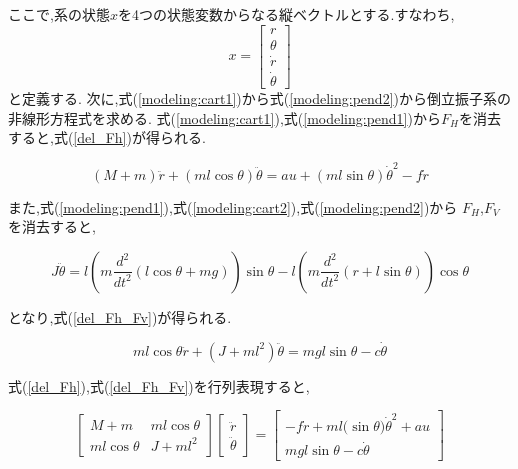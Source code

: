 ここで,系の状態$x$を4つの状態変数からなる縦ベクトルとする.すなわち,
$$
    x = \left[
    \begin{array}{c}
        r \\
        \theta \\
        \dot{r} \\
        \dot{\theta}
    \end{array}
    \right]
$$
と定義する.
次に,式(\ref{modeling:cart1})から式(\ref{modeling:pend2})から倒立振子系の非線形方程式を求める.
式(\ref{modeling:cart1}),式(\ref{modeling:pend1})から$F_{H}$を消去すると,式(\ref{del_Fh})が得られる.

\begin{equation}
    (M + m) \ddot{r} + (ml\cos{\theta}) \ddot{\theta} = au + (ml\sin{\theta}) \dot{\theta}^2 - f \dot{r}
    \label{del_Fh}
\end{equation}

また,式(\ref{modeling:pend1}),式(\ref{modeling:cart2}),式(\ref{modeling:pend2})から
$F_{H}$,$F_{V}$を消去すると,

$$
    J \ddot \theta = l\left(
        m\frac{d^2}{dt^2}\left(
            l\cos{\theta} + mg
            \right)
        \right)\sin{\theta}
        -
        l\left(
            m\frac{d^2}{dt^2}\left(
                r + l\sin{\theta}
            \right)
        \right)\cos{\theta}
$$

となり,式(\ref{del_Fh_Fv})が得られる.

\begin{equation}
    ml\cos{\theta} \ddot{r} + (J + ml^2) \ddot{\theta} = mgl\sin{\theta} -c \dot{\theta}
    \label{del_Fh_Fv}
\end{equation}

式(\ref{del_Fh}),式(\ref{del_Fh_Fv})を行列表現すると,

$$
    \left[
    \begin{array}{cc}
        M + m          &  ml\cos{\theta} \\
        ml\cos{\theta}  &  J + ml^2
    \end{array}
    \right]
    \left[
    \begin{array}{c}
        \ddot{r} \\
        \ddot{\theta}
    \end{array}    
    \right]
    =
    \left[
        \begin{array}{c}
            -f \dot{r} + ml(\sin{\theta)} \dot{\theta}^2 + au \\
            mgl\sin{\theta} - c \dot{\theta}
        \end{array}
    \right]
$$

